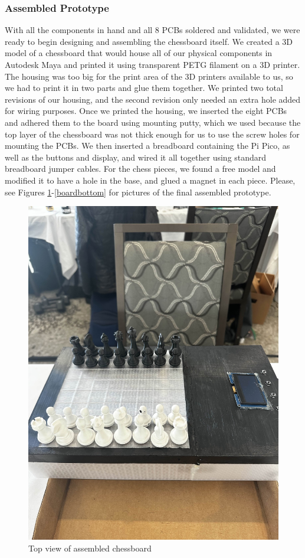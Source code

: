 \documentclass[11pt,journal]{IEEEtran}
\begin{document}
\subsubsection{Assembled Prototype}
With all the components in hand and all 8 PCBs soldered and validated, we were ready to begin designing and assembling the chessboard itself. We created a 3D model of a chessboard that would house all of our physical components in Autodesk Maya and printed it using transparent PETG filament on a 3D printer. The housing was too big for the print area of the 3D printers available to us, so we had to print it in two parts and glue them together. We printed two total revisions of our housing, and the second revision only needed an extra hole added for wiring purposes. Once we printed the housing, we inserted the eight PCBs and adhered them to the board using mounting putty, which we used because the top layer of the chessboard was not thick enough for us to use the screw holes for mounting the PCBs. We then inserted a breadboard containing the Pi Pico, as well as the buttons and display, and wired it all together using standard breadboard jumper cables. For the chess pieces, we found a free model and modified it to have a hole in the base, and glued a magnet in each piece. Please, see Figures \ref{boardtop}-\ref{boardbottom} for pictures of the final assembled prototype.
\begin{figure}[ht]
  \includegraphics[width=\linewidth]{boardTop.jpg}
  \caption{Top view of assembled chessboard}
  \label{boardtop}
\end{figure}
\end{document}
